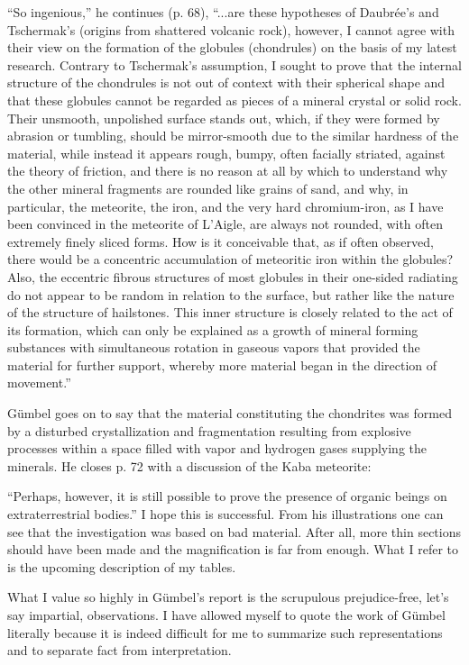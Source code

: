 \documentclass[a4paper, 12pt, oneside]{article}
\begin{document}
``So ingenious,'' he continues (p. 68), ``...are these hypotheses of Daubrée's and Tschermak's (origins from shattered volcanic rock), however, I cannot agree with their view on the formation of the globules (chondrules) on the basis of my latest research. Contrary to Tschermak's assumption, I sought to prove that the internal structure of the chondrules is not out of context with their spherical shape and that these globules cannot be regarded as pieces of a mineral crystal or solid rock. Their unsmooth, unpolished surface stands out, which, if they were formed by abrasion or tumbling, should be mirror-smooth due to the similar hardness of the material, while instead it appears rough, bumpy, often facially striated, against the theory of friction, and there is no reason at all by which to understand why the other mineral fragments are rounded like grains of sand, and why, in particular, the meteorite, the iron, and the very hard chromium-iron, as I have been convinced in the meteorite of L'Aigle, are always not rounded, with often extremely finely sliced forms. How is it conceivable that, as if often observed, there would be a concentric accumulation of meteoritic iron within the globules? Also, the eccentric fibrous structures of most globules in their one-sided radiating do not appear to be random in relation to the surface, but rather like the nature of the structure of hailstones. This inner structure is closely related to the act of its formation, which can only be explained as a growth of mineral forming substances with simultaneous rotation in gaseous vapors that provided the material for further support, whereby more material began in the direction of movement.''

Gümbel goes on to say that the material constituting the chondrites was formed by a disturbed crystallization and fragmentation resulting from explosive processes within a space filled with vapor and hydrogen gases supplying the minerals. He closes p. 72 with a discussion of the Kaba meteorite:

``Perhaps, however, it is still possible to prove the presence of organic beings on extraterrestrial bodies.'' I hope this is successful. From his illustrations one can see that the investigation was based on bad material. After all, more thin sections should have been made and the magnification is far from enough. What I refer to is the upcoming description of my tables.

What I value so highly in Gümbel's report is the scrupulous prejudice-free, let's say impartial, observations. I have allowed myself to quote the work of Gümbel literally because it is indeed difficult for me to summarize such representations and to separate fact from interpretation.
\end{document}
